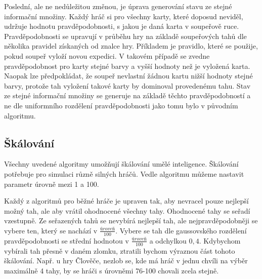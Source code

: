 Poslední, ale ne nedůležitou změnou, je úprava generování stavu ze stejné informační množiny. Každý hráč si pro všechny karty, které doposud neviděl, udržuje hodnotu pravděpodobnosti, s jakou je daná karta v soupeřově ruce. Pravděpodobnosti se upravují v průběhu hry na základě soupeřových tahů dle několika pravidel získaných od znalce hry. Příkladem je pravidlo, které se použije, pokud soupeř vyloží novou expedici. V takovém případě se zvedne pravděpodobnost pro karty stejné barvy a vyšší hodnoty než je vyložená karta. Naopak lze předpokládat, že soupeř nevlastní žádnou kartu nižší hodnoty stejné barvy, protože tah vyložení takové karty by dominoval provedenému tahu. Stav ze stejné informační množiny se generuje na základě těchto pravděpodobností a ne dle uniformního rozdělení pravděpodobnosti jako tomu bylo v původním algoritmu.

\subsection{Škálování}

Všechny uvedené algoritmy umožňují škálování umělé inteligence. Škálování potřebuje pro simulaci různě silných hráčů. Vedle algoritmu můžeme nastavit parametr úrovně mezi 1 a 100.

Každý z algoritmů pro běžné hráče je upraven tak, aby nevracel pouze nejlepší možný tah, ale aby vrátil ohodnocené všechny tahy. Ohodnocené tahy se seřadí vzestupně.
Ze seřazených tahů se nevybírá nejlepší tah, ale nejpravděpodobněji se vybere ten, který se nachází v $\frac{úroveň}{100}$. Vybere se tah dle gaussovského rozdělení pravděpodobnosti se střední hodnotou v $\frac{úroveň}{100}$ a odchylkou $0,4$. Kdybychom vybírali tah přesně v daném zlomku, ztratili bychom výraznou část tohoto škálování. Např. u hry Člověče, nezlob se, kde má hráč v jednu chvíli na výběr maximálně 4 tahy, by se hráči s úrovněmi 76-100 chovali zcela stejně.

\endinput
